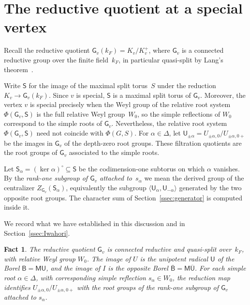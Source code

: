 \documentclass[11pt]{amsart}
\newtheorem{fact}[theorem]{Fact}
\theoremstyle{definition}
\theoremstyle{remark}
\newcommand{\barr}[1]{\overline{#1}}
\begin{document}
\section{The reductive quotient at a special vertex}\label{sec:finite}

Recall the reductive quotient $\mathsf{G}_v(k_F) = K_v/K_v^+$, where $\mathsf{G}_v$ is a connected reductive group over the finite field~$k_F$, in particular quasi-split by Lang's theorem~\cite{Lang}.


Write $\mathsf{S}$ for the image of the maximal split torus~$S$ under the reduction $K_v\to\mathsf{G}_v(k_F)$. Since $v$ is special, $\mathsf{S}$ is a maximal split torus of $\mathsf{G}_v$. Moreover, the vertex $v$ is special precisely when the Weyl group of the relative root system $\Phi(\mathsf{G}_v,\mathsf{S})$ is the full relative Weyl group~$W_0$, so the simple reflections of $W_0$ correspond to the simple roots of $\mathsf{G}_v$. Nevertheless, the relative root system $\Phi(\mathsf{G}_v,\mathsf{S})$ need not coincide with $\Phi(G,S)$. For $\alpha\in\Delta$, let $\mathsf{U}_{\pm\alpha} = U_{\pm\alpha,0}/U_{\pm\alpha,0+}$ be the images in $\mathsf{G}_v$ of the depth-zero root groups. These filtration quotients are the root groups of $\mathsf{G}_v$ associated to the simple roots.

Let $\mathsf{S}_\alpha = (\ker\alpha)^\circ\subseteq\mathsf{S}$ be the codimension-one subtorus on which $\alpha$ vanishes. By the \emph{rank-one subgroup of $\mathsf{G}_v$ attached to~$s_\alpha$} we mean the derived group of the centralizer $Z_{\mathsf{G}_v}(\mathsf{S}_\alpha)$, equivalently the subgroup $\langle\mathsf{U}_\alpha,\mathsf{U}_{-\alpha}\rangle$ generated by the two opposite root groups. The character sum of Section~\ref{ssec:generator} is computed inside it.

We record what we have established in this discussion and in Section~\ref{ssec:Iwahori}.

\begin{fact}\label{fact:finite}
The reductive quotient $\mathsf{G}_v$ is connected reductive and quasi-split over~$k_F$, with relative Weyl group $W_0$. The image of $U$ is the unipotent radical $\mathsf{U}$ of the Borel $\mathsf{B} = \mathsf{M}\mathsf{U}$, and the image of $I$ is the opposite Borel $\barr{\mathsf{B}} = \mathsf{M}\barr{\mathsf{U}}$. For each simple root $\alpha \in \Delta$, with corresponding simple reflection $s_\alpha \in W_0$, the reduction map identifies $U_{\pm\alpha,0}/U_{\pm\alpha,0+}$ with the root groups of the rank-one subgroup of $\mathsf{G}_v$ attached to $s_\alpha$.
\end{fact}
\end{document}
